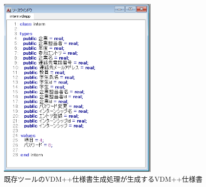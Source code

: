 \begin{figure}[tp]
    \begin{center}
        \includegraphics[width=300]{image/exis_vdm.png}
        \caption{既存ツールのVDM++仕様書生成処理が生成するVDM++仕様書}
        \label{fig:exis_vdm}
    \end{center}
\end{figure}